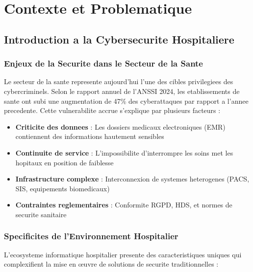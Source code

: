 \chapter{Contexte et Problematique}

\section{Introduction a la Cybersecurite Hospitaliere}

\subsection{Enjeux de la Securite dans le Secteur de la Sante}

Le secteur de la sante represente aujourd'hui l'une des cibles privilegiees des cybercriminels. Selon le rapport annuel de l'ANSSI 2024, les etablissements de sante ont subi une augmentation de 47\% des cyberattaques par rapport a l'annee precedente. Cette vulnerabilite accrue s'explique par plusieurs facteurs :

\begin{itemize}
    \item \textbf{Criticite des donnees} : Les dossiers medicaux electroniques (EMR) contiennent des informations hautement sensibles
    \item \textbf{Continuite de service} : L'impossibilite d'interrompre les soins met les hopitaux en position de faiblesse
    \item \textbf{Infrastructure complexe} : Interconnexion de systemes heterogenes (PACS, SIS, equipements biomedicaux)
    \item \textbf{Contraintes reglementaires} : Conformite RGPD, HDS, et normes de securite sanitaire
\end{itemize}

\subsection{Specificites de l'Environnement Hospitalier}

L'ecosysteme informatique hospitalier presente des caracteristiques uniques qui complexifient la mise en œuvre de solutions de securite traditionnelles :

